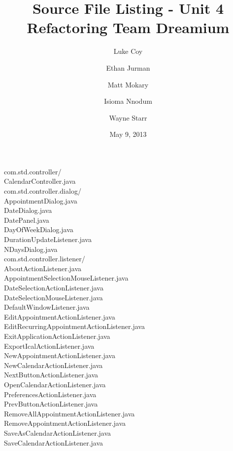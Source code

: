 \documentclass[a4paper,12pt]{article}
\title{
    Source File Listing - Unit 4 Refactoring
    Team Dreamium
}
\author{
    Luke Coy
    \and
    Ethan Jurman
    \and
    Matt Mokary
    \and
    Isioma Nnodum
    \and
    Wayne Starr
}
\date{May 9, 2013}
\newcommand{\tab}{\hspace*{3em}}
\begin{document}
\maketitle

\fontsize{14}{14}
\ttfamily

com.std.controller/\\
\tab CalendarController.java\\
\tab com.std.controller.dialog/\\
\tab \tab AppointmentDialog.java\\
\tab \tab DateDialog.java\\
\tab \tab DatePanel.java\\
\tab \tab DayOfWeekDialog.java\\
\tab \tab DurationUpdateListener.java\\
\tab \tab NDaysDialog.java\\
\tab com.std.controller.listener/\\
\tab \tab AboutActionListener.java\\
\tab \tab AppointmentSelectionMouseListener.java\\
\tab \tab DateSelectionActionListener.java\\
\tab \tab DateSelectionMouseListener.java\\
\tab \tab DefaultWindowListener.java\\
\tab \tab EditAppointmentActionListener.java\\
\tab \tab EditRecurringAppointmentActionListener.java\\
\tab \tab ExitApplicationActionListener.java\\
\tab \tab ExportIcalActionListener.java\\
\tab \tab NewAppointmentActionListener.java\\
\tab \tab NewCalendarActionListener.java\\
\tab \tab NextButtonActionListener.java\\
\tab \tab OpenCalendarActionListener.java\\
\tab \tab PreferencesActionListener.java\\
\tab \tab PrevButtonActionListener.java\\
\tab \tab RemoveAllAppointmentActionListener.java\\
\tab \tab RemoveAppointmentActionListener.java\\
\tab \tab SaveAsCalendarActionListener.java\\
\tab \tab SaveCalendarActionListener.java\\
\end{document}
